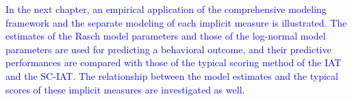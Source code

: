 \documentclass[12pt]{book}
\begin{document}
\textcolor{blue}{In the next chapter, an empirical application of the comprehensive modeling framework and the separate modeling of each implicit measure is illustrated.
	The estimates of the Rasch model parameters and those of the log-normal model parameters are used for predicting a behavioral outcome, and their predictive performances are compared with those of the typical scoring method of the IAT and the SC-IAT. 
	The relationship between the model estimates and the typical scores of these implicit measures are investigated as well. }

 
% 
%
\end{document}
